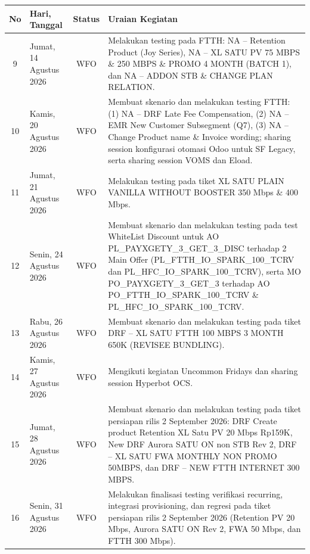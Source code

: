 \documentclass[12pt,a4paper]{article}
\begin{document}
\clearpage
\begin{singlespace}
\noindent
\begin{tabular}{|c|p{2.6cm}|c|p{9.8cm}|}
\hline
\textbf{No} & \textbf{Hari, Tanggal} & \textbf{Status} & \textbf{Uraian Kegiatan} \\
\hline
9 & Jumat, 14 Agustus 2026 & WFO & Melakukan testing pada FTTH: NA -- Retention Product (Joy Series), NA -- XL SATU PV 75 MBPS \& 250 MBPS \& PROMO 4 MONTH (BATCH 1), dan NA -- ADDON STB \& CHANGE PLAN RELATION. \\
\hline
10 & Kamis, 20 Agustus 2026 & WFO & Membuat skenario dan melakukan testing FTTH: (1) NA -- DRF Late Fee Compensation, (2) NA -- EMR New Customer Subsegment (Q7), (3) NA -- Change Product name \& Invoice wording; sharing session konfigurasi otomasi Odoo untuk SF Legacy, serta sharing session VOMS dan Eload. \\
\hline
11 & Jumat, 21 Agustus 2026 & WFO & Melakukan testing pada tiket XL SATU PLAIN VANILLA WITHOUT BOOSTER 350 Mbps \& 400 Mbps. \\
\hline
12 & Senin, 24 Agustus 2026 & WFO & Membuat skenario dan melakukan testing pada test WhiteList Discount untuk AO PL\_PAYXGETY\_3\_GET\_3\_DISC terhadap 2 Main Offer (PL\_FTTH\_IO\_SPARK\_100\_TCRV dan PL\_HFC\_IO\_SPARK\_100\_TCRV), serta MO PO\_PAYXGETY\_3\_GET\_3 terhadap AO PO\_FTTH\_IO\_SPARK\_100\_TCRV \& PL\_HFC\_IO\_SPARK\_100\_TCRV. \\
\hline
13 & Rabu, 26 Agustus 2026 & WFO & Membuat skenario dan melakukan testing pada tiket DRF -- XL SATU FTTH 100 MBPS 3 MONTH 650K (REVISEE BUNDLING). \\
\hline
14 & Kamis, 27 Agustus 2026 & WFO & Mengikuti kegiatan Uncommon Fridays dan sharing session Hyperbot OCS. \\
\hline
15 & Jumat, 28 Agustus 2026 & WFO & Membuat skenario dan melakukan testing pada tiket persiapan rilis 2 September 2026: DRF Create product Retention XL Satu PV 20 Mbps Rp159K, New DRF Aurora SATU ON non STB Rev 2, DRF -- XL SATU FWA MONTHLY NON PROMO 50MBPS, dan DRF -- NEW FTTH INTERNET 300 MBPS. \\
\hline
16 & Senin, 31 Agustus 2026 & WFO & Melakukan finalisasi testing verifikasi recurring, integrasi provisioning, dan regresi pada tiket persiapan rilis 2 September 2026 (Retention PV 20 Mbps, Aurora SATU ON Rev 2, FWA 50 Mbps, dan FTTH 300 Mbps). \\
\hline
\end{tabular}
\end{singlespace}
\end{document}
